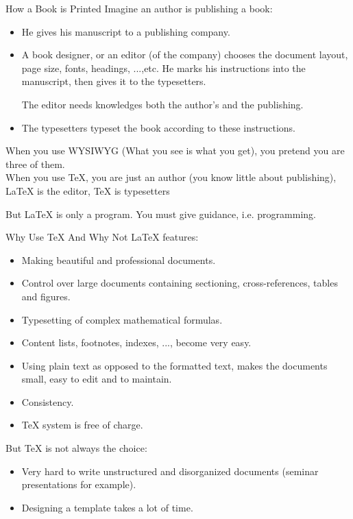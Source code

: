 \documentclass[10pt,t]{beamer}
\begin{document}
\begin{frame}{How a Book is Printed}
Imagine an author is publishing a book:
\begin{itemize}
    \item He gives his manuscript to a publishing company.
    \item A book designer, or an editor (of the company) chooses
        the document layout, page size, fonts, headings, ...,etc.
        He marks his instructions into the manuscript, then gives
        it to the typesetters.

        The editor needs knowledges both the author's and the publishing.
    \item The typesetters typeset the book according to these instructions.
\end{itemize}

    When you use WYSIWYG (\alert{What you see is what you get}),
    you pretend you are three of them.\\[10pt]

    When you use \TeX{}, you are just an author (you know little
    about publishing), \LaTeX{} is the editor, \TeX{} is typesetters

    But \LaTeX{} is only a program. You must give guidance, i.e.
    programming.
\end{frame}

\begin{frame}{Why Use \TeX{} And Why Not}
\LaTeX{} features:
\begin{itemize}
    \item Making beautiful and professional documents.
    \item Control over large documents containing sectioning,
        cross-references, tables and figures.
    \item Typesetting of complex mathematical formulas.
    \item Content lists, footnotes, indexes, ..., become very easy.
    \item Using plain text as opposed to the formatted text,
        makes the documents small, easy to edit and to maintain.
    \item Consistency.
    \item \TeX{} system is free of charge.
\end{itemize}

    But \TeX{} is not always the choice:
\begin{itemize}
    \item Very hard to write unstructured and disorganized documents
        (seminar presentations for example).
    \item Designing a template takes a lot of time.
\end{itemize}
\end{frame}
\end{document}
